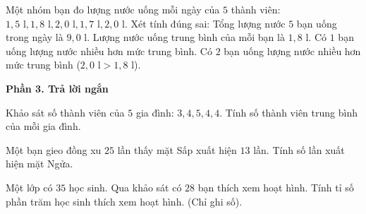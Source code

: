 \begin{ex} %
Một nhóm bạn đo lượng nước uống mỗi ngày của $5$ thành viên: $1{,}5\text{ l}, 1{,}8\text{ l}, 2{,}0\text{ l}, 1{,}7\text{ l}, 2{,}0\text{ l}$. Xét tính đúng sai:
\choiceTF
{\True Tổng lượng nước $5$ bạn uống trong ngày là $9{,}0\text{ l}$.}
{\True Lượng nước uống trung bình của mỗi bạn là $1{,}8\text{ l}$.}
{Có $1$ bạn uống lượng nước nhiều hơn mức trung bình.}
{\True Có $2$ bạn uống lượng nước nhiều hơn mức trung bình ($2{,}0\text{ l} > 1{,}8\text{ l}$).}
\end{ex}

\textbf{Phần 3. Trả lời ngắn}

\begin{ex} %
Khảo sát số thành viên của $5$ gia đình: $3, 4, 5, 4, 4$. Tính số thành viên trung bình của mỗi gia đình.
\end{ex}

\begin{ex} %
Một bạn gieo đồng xu $25$ lần thấy mặt Sấp xuất hiện $13$ lần. Tính số lần xuất hiện mặt Ngửa.
\end{ex}

\begin{ex} %
Một lớp có $35$ học sinh. Qua khảo sát có $28$ bạn thích xem hoạt hình. Tính tỉ số phần trăm học sinh thích xem hoạt hình. (Chỉ ghi số).
\end{ex}

